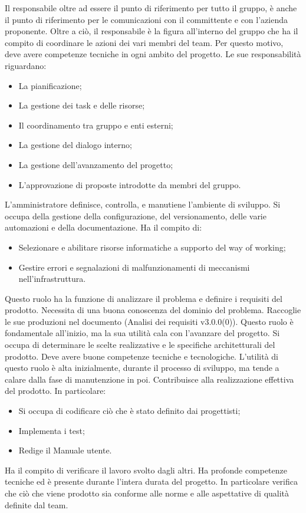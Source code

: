 \documentclass[10pt, a4paper]{article}
\begin{document}
Il responsabile oltre ad essere il punto di riferimento per tutto il gruppo, è anche il punto di riferimento per le comunicazioni con il committente e con l'azienda proponente. Oltre a ciò, il responsabile è la figura all'interno del gruppo che ha il compito di coordinare le azioni dei vari membri del team. Per questo motivo, deve avere competenze tecniche in ogni ambito del progetto.
Le sue responsabilità riguardano:
\begin{itemize}
    \item La pianificazione;
    \item La gestione dei task e delle risorse;
    \item Il coordinamento tra gruppo e enti esterni;
    \item La gestione del dialogo interno;
    \item La gestione dell'avanzamento del progetto;
    \item L'approvazione di proposte introdotte da membri del gruppo.
\end{itemize}
L'amministratore definisce, controlla, e manutiene l'ambiente di sviluppo. Si occupa della gestione della configurazione, del versionamento, delle varie automazioni e della documentazione.
Ha il compito di:
\begin{itemize}
    \item Selezionare e abilitare risorse informatiche a supporto del way of working;
    \item Gestire errori e segnalazioni di malfunzionamenti di meccanismi nell'infrastruttura.
\end{itemize}
Questo ruolo ha la funzione di analizzare il problema e definire i requisiti del prodotto. Necessita di una buona conoscenza del dominio del problema. Raccoglie le sue produzioni nel documento (Analisi dei requisiti v3.0.0(0)).
Questo ruolo è fondamentale all'inizio, ma la sua utilità cala con l'avanzare del progetto. 
Si occupa di determinare le scelte realizzative e le specifiche architetturali del prodotto. Deve avere buone competenze tecniche e tecnologiche. L'utilità di questo ruolo è alta inizialmente, durante il processo di sviluppo, ma tende a calare dalla fase di manutenzione in poi.
Contribuisce alla realizzazione effettiva del prodotto.
In particolare:
\begin{itemize}
    \item Si occupa di codificare ciò che è stato definito dai progettisti;
    \item Implementa i test;
    \item Redige il Manuale utente.
\end{itemize}
Ha il compito di verificare il lavoro svolto dagli altri.
Ha profonde competenze tecniche ed è presente durante l'intera durata del progetto.
In particolare verifica che ciò che viene prodotto sia conforme alle norme e alle aspettative di qualità definite dal team.
\end{document}
